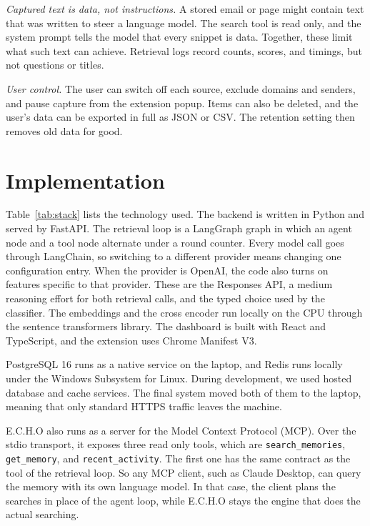 \documentclass[conference]{IEEEtran}
\begin{document}
\textit{Captured text is data, not instructions.} A stored email or page might contain text that was written to steer a language model. The search tool is read only, and the system prompt tells the model that every snippet is data. Together, these limit what such text can achieve. Retrieval logs record counts, scores, and timings, but not questions or titles.

\textit{User control.} The user can switch off each source, exclude domains and senders, and pause capture from the extension popup. Items can also be deleted, and the user's data can be exported in full as JSON or CSV. The retention setting then removes old data for good.

\section{Implementation}\label{sec:impl}
Table~\ref{tab:stack} lists the technology used. The backend is written in Python and served by FastAPI. The retrieval loop is a LangGraph graph \cite{b5} in which an agent node and a tool node alternate under a round counter. Every model call goes through LangChain, so switching to a different provider means changing one configuration entry. When the provider is OpenAI, the code also turns on features specific to that provider. These are the Responses API, a medium reasoning effort for both retrieval calls, and the typed choice used by the classifier. The embeddings and the cross encoder run locally on the CPU through the sentence transformers library. The dashboard is built with React and TypeScript, and the extension uses Chrome Manifest V3.

PostgreSQL 16 runs as a native service on the laptop, and Redis runs locally under the Windows Subsystem for Linux. During development, we used hosted database and cache services. The final system moved both of them to the laptop, meaning that only standard HTTPS traffic leaves the machine.

E.C.H.O also runs as a server for the Model Context Protocol (MCP). Over the stdio transport, it exposes three read only tools, which are \texttt{search\_memories}, \texttt{get\_memory}, and \texttt{recent\_activity}. The first one has the same contract as the tool of the retrieval loop. So any MCP client, such as Claude Desktop, can query the memory with its own language model. In that case, the client plans the searches in place of the agent loop, while E.C.H.O stays the engine that does the actual searching.
\end{document}
